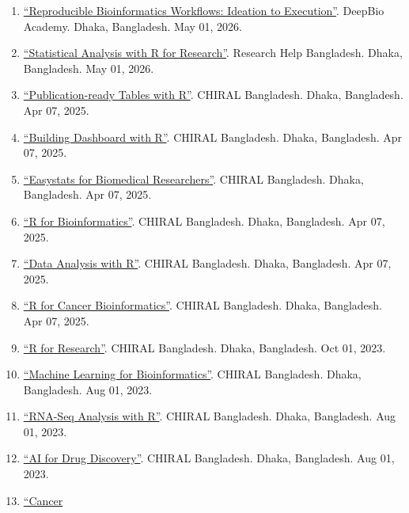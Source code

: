 \documentclass[
  11pt,
  letterpaper,
  DIV=11,
  numbers=noendperiod]{scrartcl}
\providecommand{\tightlist}{%
  \setlength{\itemsep}{0pt}\setlength{\parskip}{0pt}}
\begin{document}
\begin{enumerate}
\def\labelenumi{\arabic{enumi}.}
\tightlist
\item
  \href{https://github.com/hossainlab/bioinfo_workflow}{``Reproducible
  Bioinformatics Workflows: Ideation to Execution''}. DeepBio Academy.
  Dhaka, Bangladesh. May 01, 2026.
\item
  \href{https://mdjubayerhossain.com/SAR/}{``Statistical Analysis with R
  for Research''}. Research Help Bangladesh. Dhaka, Bangladesh. May 01,
  2026.
\item
  \href{https://deepbioacademy.github.io/gtsummary/}{``Publication-ready
  Tables with R''}. CHIRAL Bangladesh. Dhaka, Bangladesh. Apr 07, 2025.
\item
  \href{https://deepbioacademy.github.io/BuildingDashboardwithR/}{``Building
  Dashboard with R''}. CHIRAL Bangladesh. Dhaka, Bangladesh. Apr 07,
  2025.
\item
  \href{https://deepbioacademy.github.io/easystats/}{``Easystats for
  Biomedical Researchers''}. CHIRAL Bangladesh. Dhaka, Bangladesh. Apr
  07, 2025.
\item
  \href{https://deepbioacademy.github.io/RforBioinformatics/}{``R for
  Bioinformatics''}. CHIRAL Bangladesh. Dhaka, Bangladesh. Apr 07, 2025.
\item
  \href{https://deepbioacademy.github.io/DataAnalysiswithR/}{``Data
  Analysis with R''}. CHIRAL Bangladesh. Dhaka, Bangladesh. Apr 07,
  2025.
\item
  \href{https://deepbioacademy.github.io/panomics/}{``R for Cancer
  Bioinformatics''}. CHIRAL Bangladesh. Dhaka, Bangladesh. Apr 07, 2025.
\item
  \href{https://www.youtube.com/playlist?list=PLQtDkvtE4BUa05wsFn5OWHEapIiSEYp7T}{``R
  for Research''}. CHIRAL Bangladesh. Dhaka, Bangladesh. Oct 01, 2023.
\item
  \href{https://www.youtube.com/playlist?list=PLQtDkvtE4BUaCZuWpLiM5bV5--gjuY5ZI}{``Machine
  Learning for Bioinformatics''}. CHIRAL Bangladesh. Dhaka, Bangladesh.
  Aug 01, 2023.
\item
  \href{https://www.youtube.com/playlist?list=PLQtDkvtE4BUZUHltq6DJ5KGrncv0gn_Zj}{``RNA-Seq
  Analysis with R''}. CHIRAL Bangladesh. Dhaka, Bangladesh. Aug 01,
  2023.
\item
  \href{https://www.youtube.com/playlist?list=PLQtDkvtE4BUYu0_nHZ4m9JcSHtLbJ_HUM}{``AI
  for Drug Discovery''}. CHIRAL Bangladesh. Dhaka, Bangladesh. Aug 01,
  2023.
\item
  \href{https://www.youtube.com/playlist?list=PLQtDkvtE4BUazUbCqCGNrsziV2heHcR2V}{``Cancer
}
\end{enumerate}
\end{document}
